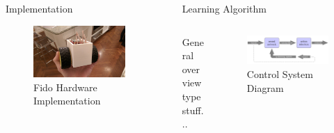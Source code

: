 \documentclass[final]{beamer}
\newlength{\sepwid}
\newlength{\onecolwid}
\newlength{\twocolwid}
\begin{document}
\begin{frame}[t]
\begin{columns}[t]
\begin{column}{\onecolwid}
\begin{block}{Implementation}
		\begin{figure}
			\centering
			\includegraphics[width=.77\linewidth]{Figures/Prototype.jpg}
			\caption{Fido Hardware Implementation}
		\end{figure}
	\end{block}


\end{column}

\begin{column}{\sepwid}\end{column} 

\begin{column}{\twocolwid}

	\begin{block}{Learning Algorithm}
		\begin{columns}[t,totalwidth=\twocolwid]
			\begin{column}{\onecolwid}
				General overview type stuff...
			\end{column}
			\begin{column}{\onecolwid}
				\begin{figure}
					\centering
					\includegraphics[width=\linewidth]{Figures/diagramRendered.png}
					\caption{Control System Diagram}
				\end{figure}
			\end{column}
		\end{columns}
	\end{block}

\begin{columns}[t,totalwidth=\twocolwid]


\end{columns}
\end{column}
\end{columns}
\end{frame}
\end{document}

